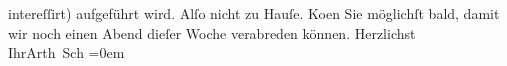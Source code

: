 \begin{ledgroupsized}[t]{13cm}
                    intereſſirt) aufgeführt wird. Alſo nicht {\pb}zu
                    Hauſe. Ko{\geminationm}en Sie möglichſt bald, damit wir noch
                    einen Abend dieſer Woche verabreden können.\pend
           \pstart
           Herzlichst{\\[\baselineskip]}Ihr\spacefill\mbox{Arth Sch}\pend
           \leftskip=0em{}          \endnumbering{}\end{ledgroupsized}  \newcommand{\dateiname}{L00080}\newcommand{\titel}{Arthur Schnitzler an Hugo von Hofmannsthal, [12. 3. 1892]}\newcommand{\editorInnen}{Martin Anton Müller und Gerd-Hermann Susen}
            \footnotesize
\begin{ledgroupsized}[t]{11.5cm}
\end{ledgroupsized}
         
      
